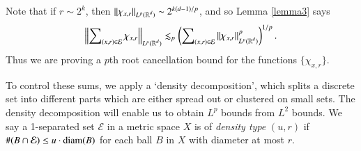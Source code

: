 \begin{remark}
    Note that if $r \sim 2^k$, then $\| \chi_{x,r} \|_{L^p(\operatorname{\mathbb{R}}^d)} \sim 2^{k(d-1)/p}$, and so Lemma \ref{lemma3} says
    \begin{equation}
      \left\| \sum\nolimits_{(x,r) \in \mathcal{E}} \chi_{x,r} \right\|_{L^p(\operatorname{\mathbb{R}}^d)} \lesssim_p \left( \sum\nolimits_{(x,r) \in \mathcal{E}} \| \chi_{x,r} \|_{L^p(\operatorname{\mathbb{R}}^d)}^p \right)^{1/p}.
    \end{equation}
    Thus we are proving a $p$th root cancellation bound for the functions $\{ \chi_{x,r} \}$.
\end{remark}

\begin{comment}
\begin{proof}[Proof of Lemma \ref{lemma2} from Lemma \ref{lemma3}]
    Let
    \[ F = \sum\nolimits_{(x,r) \in \mathcal{E}} \chi_{x,r} \]
    and then for $k \geq 1$, let
    \[ F_k = \sum\nolimits_{(x,r) \in \mathcal{E}_k} \chi_{x,r}. \]
    Then $F = \sum\nolimits_k F_k$, and. Applying a dyadic interpolation result (Lemma 2.2 of that paper), the bound
    \[ \| F_k \|_{L^r(\RR^d)} \lesssim 2^k (2^{k(d-r-1)} \#(\mathcal{E}_k)^{1/r}) \]
    which holds for $r$ to the left and right of $p$, can be interpolated to yield that
    \[ \| F \|_{L^p(\RR^d)} \lesssim \left( \sum\nolimits_k 2^{kp} ( 2^{k(d-r-1)} ) \right)^{1/p} \]


    Applying a dyadic interpolation result (Lemma 2.2 of the paper), Lemma \ref{lemma3} implies that
    \[ \left\| \sum\nolimits_{(x,r) \in \mathcal{E}} \chi_{x,r} \right\| \]

    \[ \left\| \sum\nolimits_{(x,r) \in \mathcal{E}} \chi_{x,r} \right\|_{L^p(\RR^d)} \lesssim \left( \sum 2^{kp} 2^{k(d-p-1)} \#(\mathcal{E}_k) \right)^{1/p} = \left( \sum 2^{k(d-1)} \#(\mathcal{E}_k) \right)^{1/p} \]
    This is a restricted strong type bound for Lemma \ref{lemma2}, which we can then interpolate.
\end{proof}
\end{comment}

To control these sums, we apply a `density decomposition', which splits a discrete set into different parts which are either spread out or clustered on small sets. The density decomposition will enable us to obtain $L^p$ bounds from $L^2$ bounds. We say a 1-separated set $\mathcal{E}$ in a metric space $X$ is of \emph{density type} $(u,r)$ if $\#(B \cap \mathcal{E}) \leq u \cdot \operatorname{\text{diam}}(B)$ for each ball $B$ in $X$ with diameter at most $r$.

